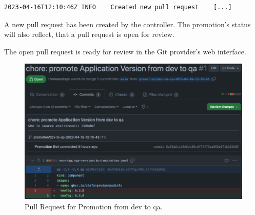 \begin{lstlisting}
2023-04-16T12:10:46Z INFO    Created new pull request    [...]
\end{lstlisting}

A new pull request
has been created by the controller.
The promotion's status will also reflect, that
a pull request is open for review.



The open pull request is ready for review in the Git provider's web interface.
\begin{figure}[h]
	\centering
	\includegraphics[width=1.00\linewidth]{assets/prom-pr-dev-to-qa.png}
	\caption{Pull Request for Promotion from dev to qa.
	}
	\label{fig:prom-pr-dev-to-qa}	
\end{figure}

